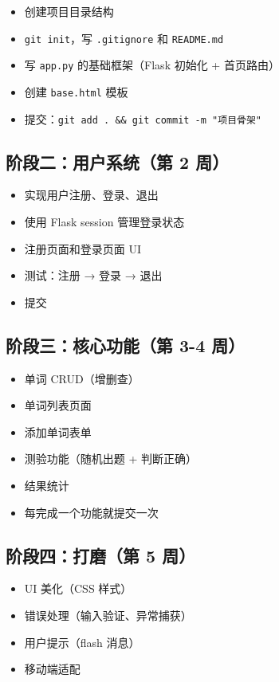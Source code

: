 \documentclass[a4paper,12pt]{ctexart}
\begin{document}
\begin{itemize}
  \item 创建项目目录结构
  \item \texttt{git init}，写 \texttt{.gitignore} 和 \texttt{README.md}
  \item 写 \texttt{app.py} 的基础框架（Flask 初始化 + 首页路由）
  \item 创建 \texttt{base.html} 模板
  \item 提交：\texttt{git add . \&\& git commit -m "项目骨架"}
\end{itemize}

\subsection*{阶段二：用户系统（第 2 周）}

\begin{itemize}
  \item 实现用户注册、登录、退出
  \item 使用 Flask session 管理登录状态
  \item 注册页面和登录页面 UI
  \item 测试：注册 → 登录 → 退出
  \item 提交
\end{itemize}

\subsection*{阶段三：核心功能（第 3-4 周）}

\begin{itemize}
  \item 单词 CRUD（增删查）
  \item 单词列表页面
  \item 添加单词表单
  \item 测验功能（随机出题 + 判断正确）
  \item 结果统计
  \item 每完成一个功能就提交一次
\end{itemize}

\subsection*{阶段四：打磨（第 5 周）}

\begin{itemize}
  \item UI 美化（CSS 样式）
  \item 错误处理（输入验证、异常捕获）
  \item 用户提示（flash 消息）
  \item 移动端适配
\end{itemize}
\end{document}
